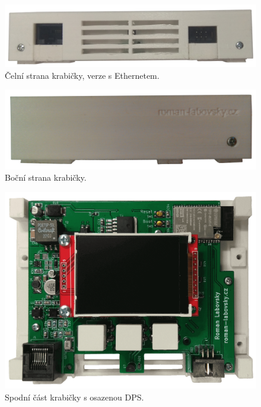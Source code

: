 \begin{figure}[H]
    \centering
    \includegraphics[width=\textwidth]{images/krabicka-nastenny-snimac-prostorove-teploty/krabicka-nastenny-snimac-prostorove-teploty-ethernet-celni-strana.png}
    \caption{Čelní strana krabičky, verze s Ethernetem.}
    \label{fig:krabicka-nastenny-snimac-prostorove-teploty-ethernet-spodni-cast-zezadu}
\end{figure}

\begin{figure}[H]
    \centering
    \includegraphics[width=\textwidth]{images/krabicka-nastenny-snimac-prostorove-teploty/krabicka-nastenny-snimac-prostorove-teploty-bocni-strana.png}
    \caption{Boční strana krabičky.}
    \label{fig:krabicka-nastenny-snimac-prostorove-teploty-prava-strana}
\end{figure}

\begin{figure}[H]
    \centering
    \includegraphics[width=\textwidth]{images/krabicka-nastenny-snimac-prostorove-teploty/krabicka-nastenny-snimac-prostorove-teploty-ethernet-spodni-cast-dps.png}
    \caption{Spodní část krabičky s osazenou DPS.}
    \label{fig:krabicka-nastenny-snimac-prostorove-teploty-ethernet-spodni-cast-dps}
\end{figure}

